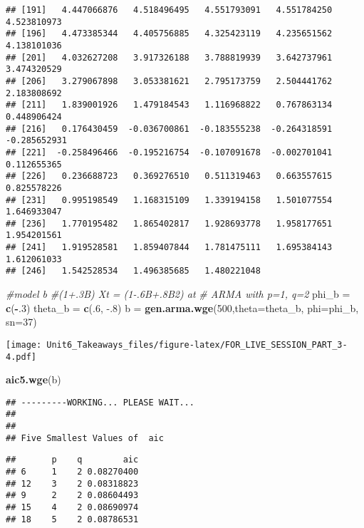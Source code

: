 \documentclass[
]{article}
\newenvironment{Shaded}{\begin{snugshade}}{\end{snugshade}}
\newcommand{\CommentTok}[1]{\textcolor[rgb]{0.56,0.35,0.01}{\textit{#1}}}
\newcommand{\DataTypeTok}[1]{\textcolor[rgb]{0.13,0.29,0.53}{#1}}
\newcommand{\DecValTok}[1]{\textcolor[rgb]{0.00,0.00,0.81}{#1}}
\newcommand{\FloatTok}[1]{\textcolor[rgb]{0.00,0.00,0.81}{#1}}
\newcommand{\KeywordTok}[1]{\textcolor[rgb]{0.13,0.29,0.53}{\textbf{#1}}}
\newcommand{\NormalTok}[1]{#1}
\newcommand{\OperatorTok}[1]{\textcolor[rgb]{0.81,0.36,0.00}{\textbf{#1}}}
\newcommand{\StringTok}[1]{\textcolor[rgb]{0.31,0.60,0.02}{#1}}
\begin{document}
\begin{verbatim}
## [191]   4.447066876   4.518496495   4.551793091   4.551784250   4.523810973
## [196]   4.473385344   4.405756885   4.325423119   4.235651562   4.138101036
## [201]   4.032627208   3.917326188   3.788819939   3.642737961   3.474320529
## [206]   3.279067898   3.053381621   2.795173759   2.504441762   2.183808692
## [211]   1.839001926   1.479184543   1.116968822   0.767863134   0.448906424
## [216]   0.176430459  -0.036700861  -0.183555238  -0.264318591  -0.285652931
## [221]  -0.258496466  -0.195216754  -0.107091678  -0.002701041   0.112655365
## [226]   0.236688723   0.369276510   0.511319463   0.663557615   0.825578226
## [231]   0.995198549   1.168315109   1.339194158   1.501077554   1.646933047
## [236]   1.770195482   1.865402817   1.928693778   1.958177651   1.954201561
## [241]   1.919528581   1.859407844   1.781475111   1.695384143   1.612061033
## [246]   1.542528534   1.496385685   1.480221048
\end{verbatim}

\begin{Shaded}
\begin{Highlighting}[]
\CommentTok{#model b}
\CommentTok{#(1+.3B) Xt = (1-.6B+.8B2) at}
\CommentTok{# ARMA with p=1, q=2}
\NormalTok{phi_b =}\StringTok{ }\KeywordTok{c}\NormalTok{(}\OperatorTok{-}\NormalTok{.}\DecValTok{3}\NormalTok{)}
\NormalTok{theta_b =}\StringTok{ }\KeywordTok{c}\NormalTok{(.}\DecValTok{6}\NormalTok{, }\FloatTok{-.8}\NormalTok{)}
\NormalTok{b =}\StringTok{ }\KeywordTok{gen.arma.wge}\NormalTok{(}\DecValTok{500}\NormalTok{,}\DataTypeTok{theta=}\NormalTok{theta_b, }\DataTypeTok{phi=}\NormalTok{phi_b,  }\DataTypeTok{sn=}\DecValTok{37}\NormalTok{)}
\end{Highlighting}
\end{Shaded}

\texttt{[image: Unit6\_Takeaways\_files/figure-latex/FOR\_LIVE\_SESSION\_PART\_3-4.pdf]}

\begin{Shaded}
\begin{Highlighting}[]
\KeywordTok{aic5.wge}\NormalTok{(b)}
\end{Highlighting}
\end{Shaded}

\begin{verbatim}
## ---------WORKING... PLEASE WAIT... 
## 
## 
## Five Smallest Values of  aic
\end{verbatim}

\begin{verbatim}
##       p    q        aic
## 6     1    2 0.08270400
## 12    3    2 0.08318823
## 9     2    2 0.08604493
## 15    4    2 0.08690974
## 18    5    2 0.08786531
\end{verbatim}
\end{document}
